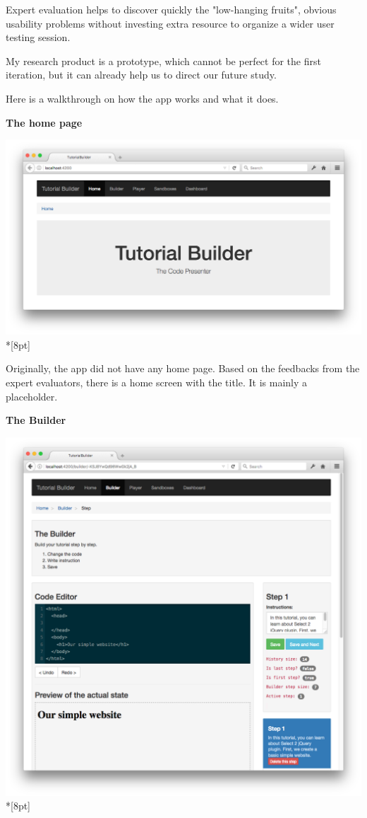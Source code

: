 \documentclass[12pt, a4paper, oneside, openright, medskipamount]{report}
\begin{document}
Expert evaluation helps to discover quickly the "low-hanging fruits", obvious usability problems without investing extra resource to organize a wider user testing session.

My research product is a prototype, which cannot be perfect for the first iteration, but it can already help us to direct our future study.

Here is a walkthrough on how the app works and what it does.

\newpage

\textbf{The home page}

\includegraphics[width=1\textwidth]{assets/tour-screenshots/home-page.png}\\*[8pt]

Originally, the app did not have any home page. Based on the feedbacks from the expert evaluators, there is a home screen with the title. It is mainly a placeholder.

\newpage

\textbf{The Builder}

\includegraphics[width=1\textwidth]{assets/tour-screenshots/the-builder.png}\\*[8pt]
\end{document}
